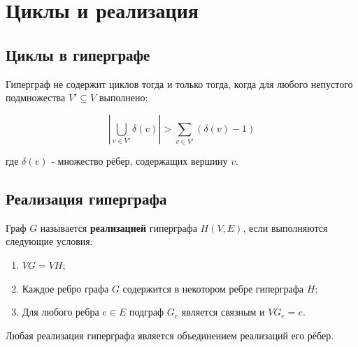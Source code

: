 {\section*{Циклы и реализация}

\subsection*{Циклы в гиперграфе}

Гиперграф не содержит циклов тогда и только тогда, когда для любого непустого подмножества $V' \subseteq V$ выполнено:


\[
\left| \bigcup_{v \in V'} \delta(v) \right| > \sum_{v \in V'} (\delta(v) - 1)
\]


где $\delta(v)$ - множество рёбер, содержащих вершину $v$.

\subsection*{Реализация гиперграфа}

Граф $G$ называется \textbf{реализацией} гиперграфа $H(V, E)$, если выполняются следующие условия:
\begin{enumerate}
  \item $VG = VH$;
  \item Каждое ребро графа $G$ содержится в некотором ребре гиперграфа $H$;
  \item Для любого ребра $e \in E$ подграф $G_e$ является связным и $VG_e = e$.
\end{enumerate}

Любая реализация гиперграфа является объединением реализаций его рёбер.


    \newpage
}
